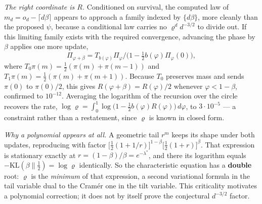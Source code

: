\documentclass[11pt,a4paper]{article}
\begin{document}
\emph{The right coordinate is \(R\).} Conditioned on survival, the
computed law of \(m_d=o_d-\lceil d\beta\rceil\) appears to approach a
family indexed by \(\{d\beta\}\), more cleanly than the proposed
\(\psi\), because a conditional law carries no \(\varrho^{d}d^{-3/2}\)
to divide out. If this limiting family exists with the required
convergence, advancing the phase by \(\beta\) applies one more update,
\[
\Pi_{\varphi+\beta}=T_{b(\varphi)}\Pi_\varphi\big/\bigl(1-\tfrac12
b(\varphi)\Pi_\varphi(0)\bigr),
\] where \(T_0\pi(m)=\tfrac12(\pi(m)+\pi(m-1))\) and
\(T_1\pi(m)=\tfrac12(\pi(m)+\pi(m+1))\). Because \(T_0\) preserves mass
and sends \(\pi(0)\) to \(\pi(0)/2\), this gives
\(R(\varphi+\beta)=R(\varphi)/2\) whenever \(\varphi<1-\beta\),
confirmed to \(10^{-12}\). Averaging the logarithm of the recursion over
the circle recovers the rate,
\(\log\varrho=\int_0^1\log\bigl(1-\tfrac12 b(\varphi)R(\varphi)\bigr)
\,d\varphi\), to \(3\cdot10^{-5}\) --- a constraint rather than a
restatement, since \(\varrho\) is known in closed form.

\emph{Why a polynomial appears at all.} A geometric tail \(r^m\) keeps
its shape under both updates, reproducing with factor
\(\bigl[\tfrac12(1+1/r)\bigr]^{1-\beta}\bigl[\tfrac12(1+r)\bigr]^{\beta}\).
That expression is stationary exactly at \(r=(1-\beta)/\beta=
e^{-\lambda^{*}}\), and there its logarithm equals
\(-\mathrm{KL}(\beta\|\tfrac12)
=\log\varrho\) identically. So the characteristic equation has a
\textbf{double} root: \(\varrho\) is the \emph{minimum} of that
expression, a second variational formula in the tail variable dual to
the Cram\'{e}r one in the tilt variable. This criticality motivates a
polynomial correction; it does not by itself prove the conjectural
\(d^{-3/2}\) factor.
\end{document}
